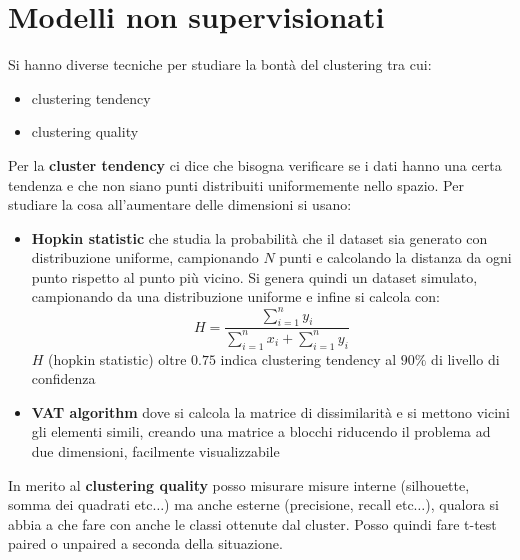 \section{Modelli non supervisionati}
Si hanno diverse tecniche per studiare la bontà del clustering tra cui:
\begin{itemize}
  \item clustering tendency
  \item clustering quality
\end{itemize}
Per la \textbf{cluster tendency} ci dice che bisogna verificare se i dati hanno
una certa tendenza e che non siano punti distribuiti uniformemente nello
spazio. Per studiare la cosa all'aumentare delle dimensioni si usano:
\begin{itemize}
  \item \textbf{Hopkin statistic} che studia la probabilità che il dataset sia
  generato con distribuzione uniforme, campionando $N$ punti e calcolando la
  distanza da ogni punto rispetto al punto più vicino. Si genera quindi un
  dataset simulato, campionando da una distribuzione uniforme e infine si
  calcola con:
  \[H=\frac{\sum_{i=1}^{n} y_{i}}{\sum_{i=1}^{n} x_{i}+\sum_{i=1}^{n} y_{i}}\]
  $H$ (hopkin statistic) oltre $0.75$ indica clustering tendency al $90\%$ di
  livello di confidenza
  \item  \textbf{VAT algorithm} dove si calcola la matrice di dissimilarità e si
  mettono vicini gli elementi simili, creando una matrice a blocchi riducendo il
  problema ad due dimensioni, facilmente visualizzabile
\end{itemize}
In merito al \textbf{clustering quality} posso misurare misure interne
(silhouette, somma dei quadrati etc$\ldots$) ma anche esterne (precisione,
recall etc$\ldots$), qualora si abbia a che fare con anche le classi ottenute
dal cluster. Posso quindi fare t-test paired o unpaired a seconda della
situazione. 